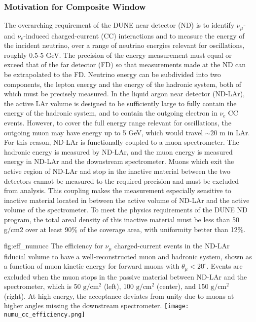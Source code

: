 \subsubsection{Motivation for Composite Window}
The overarching requirement of the DUNE near detector (ND) is to identify $\nu_\mu$- and $\nu_e$-induced charged-current (CC) interactions and to measure the energy of the incident neutrino, over a range of neutrino energies relevant for oscillations, roughly 0.5-5 GeV. The precision of the energy measurement must equal or exceed that of the far detector (FD) so that measurements made at the ND can be extrapolated to the FD. Neutrino energy can be subdivided into two components, the lepton energy and the energy of the hadronic system, both of which must be precisely measured.  In the liquid argon near detector (ND-LAr), the active LAr volume is designed to be sufficiently large to fully contain the energy of the hadronic system, and to contain the outgoing electron in $\nu_e$ CC events. However, to cover the full energy range relevant for oscillations, the outgoing muon may have energy up to 5 GeV, which would travel $\sim 20$ m in LAr. For this reason, ND-LAr is functionally coupled to a muon spectrometer. The hadronic energy is measured by ND-LAr, and the muon energy is measured energy in ND-LAr and the downstream spectrometer. Muons which exit the active region of ND-LAr and stop in the inactive material between the two detectors cannot be measured to the required precision and must be excluded from analysis. This coupling makes the measurement especially sensitive to inactive material located in between the active volume of ND-LAr and the active volume of the spectrometer. To meet the physics requirements of the DUNE ND program, the total areal density of this inactive material must be less than 50 g/cm2 over at least 90\% of the coverage area, with uniformity better than 12\%.

\begin{dunefigure}{fig:eff_numucc}
{The efficiency for $\nu_\mu$ charged-current events in the ND-LAr fiducial volume to have a well-reconstructed muon and hadronic system, shown as a function of muon kinetic energy for forward muons with $\theta_\mu< 20^\circ$. Events are excluded when the muon stops in the passive material between ND-LAr and the spectrometer, which is 50 $\mbox{g}/\mbox{cm}^2$ (left), 100 $\mbox{g}/\mbox{cm}^2$ (center), and 150 $\mbox{g}/\mbox{cm}^2$ (right). At high energy, the acceptance deviates from unity due to muons at higher angles missing the downstream spectrometer.}
\texttt{[image: numu\_cc\_efficiency.png]}
\end{dunefigure}

